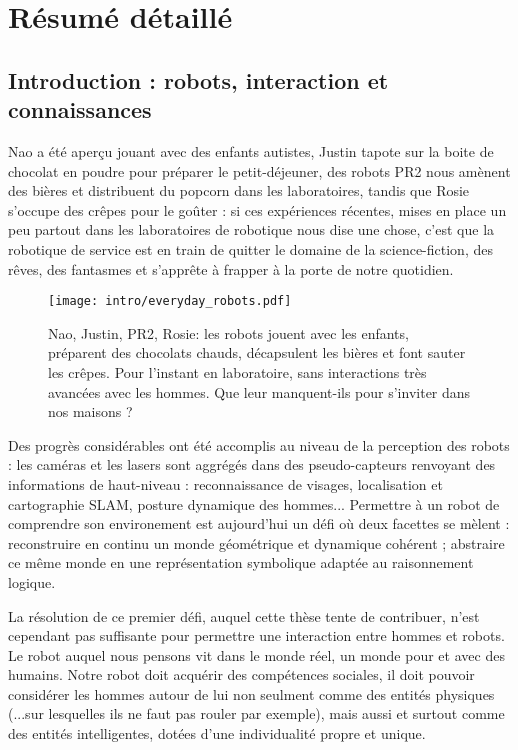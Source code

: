 \chapter{Résumé détaillé}


\section{Introduction : robots, interaction et connaissances}
\label{chapt|introduction}

Nao a été aperçu jouant avec des enfants autistes, Justin tapote sur la boite
de chocolat en poudre pour préparer le petit-déjeuner, des robots PR2 nous
amènent des bières et distribuent du popcorn dans les laboratoires, tandis que
Rosie s'occupe des crêpes pour le goûter : si ces expériences récentes, mises
en place un peu partout dans les laboratoires de robotique nous dise une chose,
c'est que la robotique de service est en train de quitter le domaine de la
science-fiction, des rêves, des fantasmes et s'apprête à frapper à la porte de
notre quotidien.

\begin{figure}[!h]
    \centering
    \texttt{[image: intro/everyday\_robots.pdf]}

    \caption*{Nao, Justin, PR2, Rosie: les robots jouent avec les enfants,
    préparent des chocolats chauds, décapsulent les bières et font sauter les
crêpes. Pour l'instant en laboratoire, sans interactions très avancées avec les
hommes. Que leur manquent-ils pour s'inviter dans nos maisons ?}

    \label{fig|everyday-robots}
\end{figure}

Des progrès considérables ont été accomplis au niveau de la perception des
robots : les caméras et les lasers sont aggrégés dans des pseudo-capteurs
renvoyant des informations de haut-niveau : reconnaissance de visages,
localisation et cartographie SLAM, posture dynamique des hommes... Permettre à
un robot de comprendre son environement est aujourd'hui un défi où deux
facettes se mèlent : reconstruire en continu un monde géométrique et dynamique
cohérent ; abstraire ce même monde en une représentation symbolique adaptée au
raisonnement logique.

La résolution de ce premier défi, auquel cette thèse tente de contribuer, n'est
cependant pas suffisante pour permettre une interaction entre hommes et robots.
Le robot auquel nous pensons vit dans le monde réel, un monde pour et avec des
humains. Notre robot doit acquérir des compétences sociales, il doit pouvoir
considérer les hommes autour de lui non seulment comme des entités physiques
(...sur lesquelles ils ne faut pas rouler par exemple), mais aussi et surtout
comme des entités intelligentes, dotées d'une individualité propre et unique.

